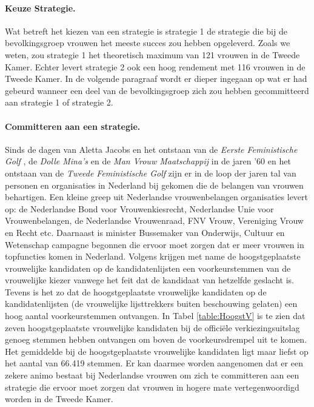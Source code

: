 \paragraph{Keuze Strategie.}
Wat betreft het kiezen van een strategie is strategie 1 de strategie die bij de bevolkingsgroep vrouwen het meeste succes zou hebben opgeleverd. Zoals we weten, zou strategie 1 het theoretisch maximum van 121 vrouwen in de Tweede Kamer. Echter levert strategie 2 ook een hoog rendement met 116 vrouwen in de Tweede Kamer. In de volgende paragraaf wordt er dieper ingegaan op wat er had gebeurd wanneer een deel van de bevolkingsgroep zich zou hebben gecommitteerd aan strategie 1 of strategie 2.

\paragraph{Committeren aan een strategie.}
Sinds de dagen van Aletta Jacobs en het ontstaan van de \textit{Eerste Feministische Golf} \citep{braun1992prijs}, de \textit{Dolle Mina's} en de \textit{Man Vrouw Maatschappij} in de jaren '60 en het ontstaan van de \textit{Tweede Feministische Golf} \citep{van2005vrouw} zijn er in de loop der jaren tal van personen en organisaties in Nederland bij gekomen die de belangen van vrouwen behartigen. Een kleine greep uit Nederlandse vrouwenbelangen organisaties levert op: de Nederlandse Bond voor Vrouwenkiesrecht, Nederlandse Unie voor Vrouwenbelangen, de Nederlandse Vrouwenraad, FNV Vrouw, Vereniging Vrouw en Recht etc. Daarnaast is minister Bussemaker van Onderwijs, Cultuur en Wetenschap \citeyearpar{navigerennaardetop} campagne begonnen die ervoor moet zorgen dat er meer vrouwen in topfuncties komen in Nederland. Volgens \cite{van2012tweede} krijgen met name de hoogstgeplaatste vrouwelijke kandidaten op de kandidatenlijsten een voorkeurstemmen van de vrouwelijke kiezer vanwege het feit dat de kandidaat van hetzelfde geslacht is. Tevens is het zo dat de hoogstgeplaatste vrouwelijke kandidaten op de kandidatenlijsten (de vrouwelijke lijsttrekkers buiten beschouwing gelaten) een hoog aantal voorkeurstemmen ontvangen. In Tabel \ref{table:HoogstV} is te zien dat zeven hoogstgeplaatste vrouwelijke kandidaten bij de offici\"{e}le verkiezingsuitslag genoeg stemmen hebben ontvangen om boven de voorkeursdrempel uit te komen. Het gemiddelde bij de hoogstgeplaatste vrouwelijke kandidaten ligt maar liefst op het aantal van 66.419 stemmen. Er kan daarmee worden aangenomen dat er een zekere animo bestaat bij Nederlandse vrouwen om zich te committeren aan een strategie die ervoor moet zorgen dat vrouwen in hogere mate vertegenwoordigd worden in de Tweede Kamer. 


